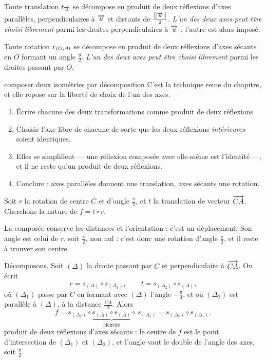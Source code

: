 \begin{theoreme}
Toute translation $t_{\overrightarrow{u}}$ se décompose en produit de deux réflexions
d'axes parallèles, perpendiculaires à $\overrightarrow{u}$ et distants de
$\frac{\left\lVert \overrightarrow{u} \right\rVert}{2}$. \emph{L'un des deux axes peut être choisi
librement} parmi les droites perpendiculaires à $\overrightarrow{u}$ ; l'autre est alors
imposé.
\end{theoreme}

\begin{theoreme}
Toute rotation $r_{(O,\,\theta)}$ se décompose en produit de deux réflexions
d'axes sécants en $O$ formant un angle $\frac{\theta}{2}$. \emph{L'un des deux
axes peut être choisi librement} parmi les droites passant par $O$.
\end{theoreme}

\begin{methode}{composer deux isométries par décomposition}
C'est la technique reine du chapitre, et elle repose sur la liberté de choix
de l'un des axes.
\begin{enumerate}[label=\textbf{\arabic*.}, leftmargin=*, itemsep=0.15em]
  \item Écrire chacune des deux transformations comme produit de deux
        réflexions.
  \item Choisir l'axe libre de chacune de sorte que les deux réflexions
        \emph{intérieures} soient identiques.
  \item Elles se simplifient — une réflexion composée avec elle-même est
        l'identité —, et il ne reste qu'un produit de deux réflexions.
  \item Conclure : axes parallèles donnent une translation, axes sécants une
        rotation.
\end{enumerate}
\end{methode}

\begin{exemple}
Soit $r$ la rotation de centre $C$ et d'angle $\frac{\pi}{2}$, et $t$ la
translation de vecteur $\overrightarrow{CA}$. Cherchons la nature de
$f = t \circ r$.

La composée conserve les distances et l'orientation : c'est un déplacement.
Son angle est celui de $r$, soit $\frac{\pi}{2}$, non nul : c'est donc une
rotation d'angle $\frac{\pi}{2}$, et il reste à trouver son centre.

Décomposons. Soit $(\Delta)$ la droite passant par $C$ et perpendiculaire à
$\overrightarrow{CA}$. On écrit
\[
  r = s_{(\Delta)} \circ s_{(\Delta_{1})},
  \qquad
  t = s_{(\Delta_{2})} \circ s_{(\Delta)},
\]
où $(\Delta_{1})$ passe par $C$ en formant avec $(\Delta)$ l'angle
$-\frac{\pi}{4}$, et où $(\Delta_{2})$ est parallèle à $(\Delta)$, à la
distance $\frac{CA}{2}$. Alors
\[
  f = s_{(\Delta_{2})} \circ \underbrace{s_{(\Delta)} \circ s_{(\Delta)}}_{
  \text{identité}} \circ\, s_{(\Delta_{1})}
  = s_{(\Delta_{2})} \circ s_{(\Delta_{1})},
\]
produit de deux réflexions d'axes sécants : le centre de $f$ est le point
d'intersection de $(\Delta_{1})$ et $(\Delta_{2})$, et l'angle vaut le double
de l'angle des axes, soit $\frac{\pi}{2}$.
\end{exemple}

